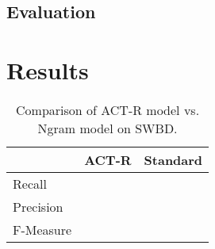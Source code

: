 \documentclass[11pt]{article}
\begin{document}

\subsection{Evaluation}

\section{Results}

\begin{table}[h]
\begin{center}
\begin{tabular}{|l|cc|}
\hline
 &ACT-R&Standard \\
\hline
Recall &  &  \\
\hline
Precision & & \\
\hline
F-Measure && \\
\hline
\end{tabular}
\end{center}
\caption{\label{swbd-results} Comparison of ACT-R model vs. Ngram model on SWBD. }
\end{table}
\end{document}
